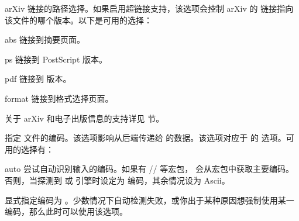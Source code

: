 \begin{optionlist}

arXiv 链接的路径选择。如果启用超链接支持，该选项会控制 arXiv 的  链接指向该文件的哪个版本。以下是可用的选择：

\begin{valuelist}
\item[abs] %
链接到摘要页面。
\item[ps] %
链接到 PostScript 版本。
\item[pdf] %
链接到 \pdf 版本。
\item[format] %
链接到格式选择页面。
\end{valuelist}

关于 arXiv 和电子出版信息的支持详见  节。


指定  文件的编码。该选项影响从后端传递给 \biblatex  的数据。该选项对应于 \biber 的  选项。可用的选择有：

\begin{valuelist}

\item[auto] %
尝试自动识别输入的编码。如果有 \slash{}\slash{} 等宏包，
\biblatex 会从宏包中获取主要编码。否则，当探测到 \XeTeX 或 \LuaTeX 引擎时设定为 \utf 编码，其余情况设为 Ascii。

\item[\prm{encoding}] %
显式指定编码为 。少数情况下自动检测失败，或你出于某种原因想强制使用某一编码，那么此时可以使用该选项。


\end{valuelist}
\end{optionlist}
